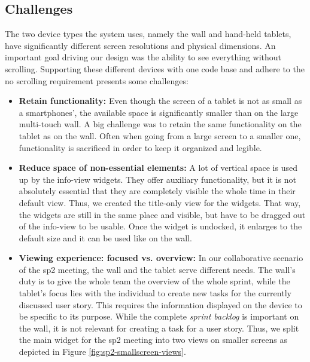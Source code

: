 \documentclass{sigchi}
\begin{document}
\subsection{Challenges}
The two device types the system uses, namely the wall and hand-held tablets, have significantly different screen resolutions and physical dimensions. 
An important goal driving our design was the ability to see everything without scrolling.
Supporting these different devices with one code base and adhere to the no scrolling requirement presents some challenges:

\begin{itemize}
	\item \textbf{Retain functionality:} 
	Even though the screen of a tablet is not as small as a smartphones', the available space is significantly smaller than on the large multi-touch wall. 
	A big challenge was to retain the same functionality on the tablet as on the wall. Often when going from a large screen to a smaller one, functionality is sacrificed in order to  keep it organized and legible.
	
	\item \textbf{Reduce space of non-essential elements:}
	A lot of vertical space is used up by the info-view widgets.
	They offer auxiliary functionality, but it is not absolutely essential that they are completely visible the whole time in their default view.
	Thus, we created the title-only view for the widgets.
	That way, the widgets are still in the same place and visible, but have to be dragged out of the info-view to be usable.
	Once the widget is undocked, it enlarges to the default size and it can be used like on the wall.
	
	\item \textbf{Viewing experience: focused vs. overview:}
	In our collaborative scenario of the \gls{sp2} meeting, the wall and the tablet serve different needs.
	The wall's duty is to give the whole team the overview of the whole sprint, while the tablet's focus lies with the individual to create new tasks for the currently discussed user story.
	This requires the information displayed on the device to be specific to its purpose.
	While the complete \textit{sprint backlog} is important on the wall, it is not relevant for creating a task for a user story.
	Thus, we split the main widget for the \gls{sp2} meeting into two views on smaller screens as depicted in Figure \ref{fig:sp2-smallscreen-views}.
	
\end{itemize}
\end{document}
